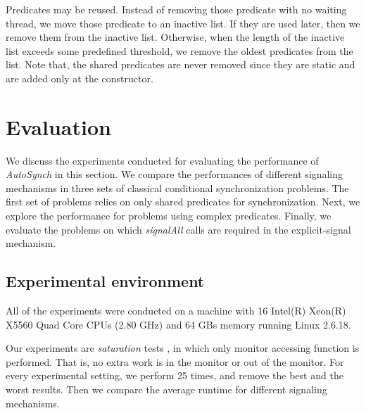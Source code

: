 \documentclass{sigplanconf}
\begin{document}
Predicates may be reused. Instead  of removing those predicate with no waiting
thread, 
we move those predicate to an inactive list. If they are used later, then we 
remove them from the inactive list. Otherwise, when the length of the inactive list exceeds some 
predefined threshold, we remove the oldest predicates from the list. Note that, the shared
predicates are never removed since they are static and are added only at the
constructor. 


\section{Evaluation} \label{sec:eval}
We discuss the experiments conducted for evaluating the performance of {\em
AutoSynch} in this section. We compare the performances of different signaling
mechanisms in three sets of classical conditional synchronization problems. 
The first set of problems relies on only shared predicates for synchronization. 
Next, we explore the performance for problems using complex predicates. 
Finally, we evaluate the problems on which {\em signalAll} calls are required 
in the explicit-signal mechanism. 

\subsection{Experimental environment}
All of the experiments were conducted on a machine with 16 Intel(R) Xeon(R) 
X5560 Quad Core CPUs (2.80 GHz) and 64 GBs memory running Linux 2.6.18. 

Our experiments are {\em saturation} tests \cite{bh05}, in which only
monitor accessing function is performed. That is, no extra work is in the
monitor or out of the monitor. For every experimental setting, we  
perform 25 times, and remove the best and the worst results. Then we compare 
the average runtime for different signaling mechanisms.
\end{document}
